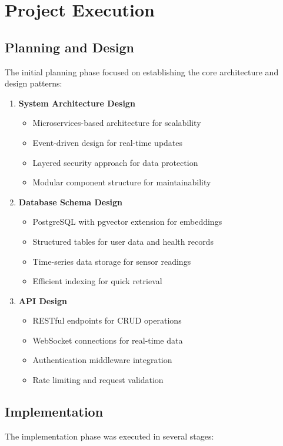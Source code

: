 \section{Project Execution}

\subsection{Planning and Design}
The initial planning phase focused on establishing the core architecture and design patterns:

\begin{enumerate}
    \item \textbf{System Architecture Design}
    \begin{itemize}
        \item Microservices-based architecture for scalability
        \item Event-driven design for real-time updates
        \item Layered security approach for data protection
        \item Modular component structure for maintainability
    \end{itemize}

    \item \textbf{Database Schema Design}
    \begin{itemize}
        \item PostgreSQL with pgvector extension for embeddings
        \item Structured tables for user data and health records
        \item Time-series data storage for sensor readings
        \item Efficient indexing for quick retrieval
    \end{itemize}

    \item \textbf{API Design}
    \begin{itemize}
        \item RESTful endpoints for CRUD operations
        \item WebSocket connections for real-time data
        \item Authentication middleware integration
        \item Rate limiting and request validation
    \end{itemize}
\end{enumerate}

\subsection{Implementation}
The implementation phase was executed in several stages:

